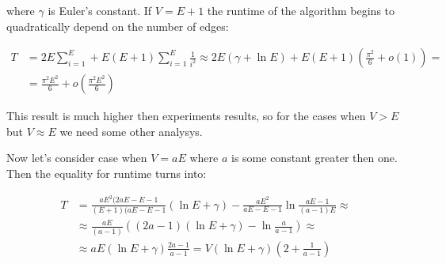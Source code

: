 \documentclass[a4paper]{article}
\begin{document}
 where $\gamma$ is Euler's constant. If $V = E + 1$ the runtime of the algorithm begins to quadratically depend on the number of edges:
 
 \begin{align*}
  T & = 2E \sum_{i = 1}^E + E(E + 1) \sum_{i = 1}^E \frac{1}{i^2} \approx 2E(\gamma + \ln{E}) + E(E + 1)(\frac{\pi^2}{6} + o(1)) = \\
    & = \frac{\pi^2 E^2}{6} + o(\frac{\pi^2 E^2}{6})
 \end{align*}

 This result is much higher then experiments results, so for the cases when $V > E$ but $V \approx E$ we need some other analysys.
 
 Now let's consider case when $V = aE$ where $a$ is some constant greater then one. Then the equality for runtime turns into:
 
 \begin{align*}
  T & = \frac{aE^2(2aE - E - 1}{(E + 1)(aE - E - 1} (\ln{E} + \gamma) - \frac{aE^2}{aE - E - 1} \ln \frac{aE - 1}{(a - 1) E} \approx \\
    & \approx \frac{aE}{(a - 1)} \left((2a - 1)(\ln{E} + \gamma) - \ln\frac{a}{a - 1} \right)\approx \\
    & \approx aE(\ln{E} + \gamma) \frac{2a - 1}{a - 1} = V(\ln{E} + \gamma)\left(2 + \frac{1}{a - 1}\right)
 \end{align*}
 
\end{document}
